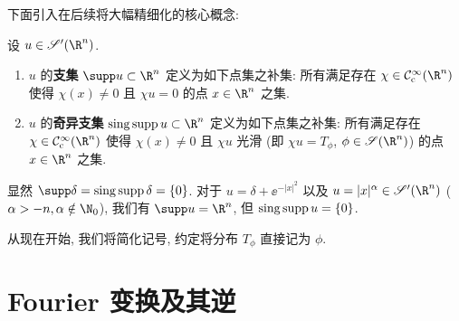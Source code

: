 下面引入在后续将大幅精细化的核心概念:

\begin{definition}[分布的支集与奇异支集]\label{def:2.6}
设 $u \in \TempDistr(\R^n)$.
\begin{enumerate}
    \item $u$ 的\textbf{支集} $\supp u \subset \R^n$ 定义为如下点集之补集: 所有满足存在 $\chi \in \SmoothComp(\R^n)$ 使得 $\chi(x) \neq 0$ 且 $\chi u = 0$ 的点 $x \in \R^n$ 之集.
    \item $u$ 的\textbf{奇异支集} $\singsupp u \subset \R^n$ 定义为如下点集之补集: 所有满足存在 $\chi \in \SmoothComp(\R^n)$ 使得 $\chi(x) \neq 0$ 且 $\chi u$ 光滑 (即 $\chi u = T_\phi$, $\phi \in \Schwartz(\R^n)$) 的点 $x \in \R^n$ 之集.
\end{enumerate}
\end{definition}

\begin{example}[支集与奇异支集]\label{eg:2.7}
显然 $\supp \delta = \singsupp \delta = \{0\}$. 对于 $u = \delta + \ee^{-|x|^2}$ 以及 $u = |x|^\alpha \in \TempDistr(\R^n)$ ($\alpha > -n, \alpha \notin \N_0$), 我们有 $\supp u = \R^n$, 但 $\operatorname{sing\,supp} u = \{0\}$.
\end{example}

从现在开始, 我们将简化记号, 约定将分布 $T_\phi$ 直接记为 $\phi$.

\section{Fourier 变换及其逆}\label{sec:2.2}
%
%

